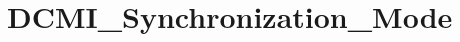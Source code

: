 \hypertarget{group___d_c_m_i___synchronization___mode}{\section{D\-C\-M\-I\-\_\-\-Synchronization\-\_\-\-Mode}
\label{group___d_c_m_i___synchronization___mode}
}
